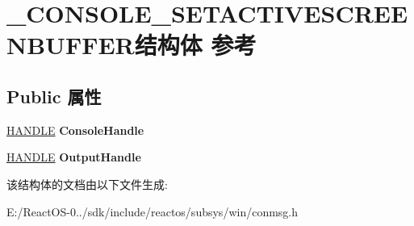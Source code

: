 \hypertarget{struct___c_o_n_s_o_l_e___s_e_t_a_c_t_i_v_e_s_c_r_e_e_n_b_u_f_f_e_r}{}\section{\+\_\+\+C\+O\+N\+S\+O\+L\+E\+\_\+\+S\+E\+T\+A\+C\+T\+I\+V\+E\+S\+C\+R\+E\+E\+N\+B\+U\+F\+F\+E\+R结构体 参考}
\label{struct___c_o_n_s_o_l_e___s_e_t_a_c_t_i_v_e_s_c_r_e_e_n_b_u_f_f_e_r}
\subsection*{Public 属性}
\begin{DoxyCompactItemize}
\item 
\mbox{\label{struct___c_o_n_s_o_l_e___s_e_t_a_c_t_i_v_e_s_c_r_e_e_n_b_u_f_f_e_r_ae64619e4f672b4b2d2e1202f4bcf0958}} 
\hyperlink{interfacevoid}{H\+A\+N\+D\+LE} {\bfseries Console\+Handle}
\item 
\mbox{\label{struct___c_o_n_s_o_l_e___s_e_t_a_c_t_i_v_e_s_c_r_e_e_n_b_u_f_f_e_r_a92ea2d3eae116c4584a611426a105107}} 
\hyperlink{interfacevoid}{H\+A\+N\+D\+LE} {\bfseries Output\+Handle}
\end{DoxyCompactItemize}


该结构体的文档由以下文件生成\+:\begin{DoxyCompactItemize}
\item 
E\+:/\+React\+O\+S-\/0../sdk/include/reactos/subsys/win/conmsg.\+h\end{DoxyCompactItemize}
